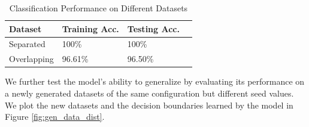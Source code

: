 \documentclass{article}
\begin{document}
\begin{table}[ht]
  \centering
  \begin{tabular}{|l|l|l|l|}
    \hline
    \textbf{Dataset} & \textbf{Training Acc.} & \textbf{Testing Acc.} \\
    \hline
    Separated & 100\% & 100\% \\
    Overlapping & 96.61\% & 96.50\% \\
    \hline
  \end{tabular}
  \caption{Classification Performance on Different Datasets}
  \label{tab:classification_perf}
\end{table}
\newpage
We further test the model's ability to generalize by evaluating its performance on a newly generated datasets of the same configuration but different seed values. We plot the new datasets and the decision boundaries learned by the model in Figure \ref{fig:gen_data_dist}. 
\end{document}
